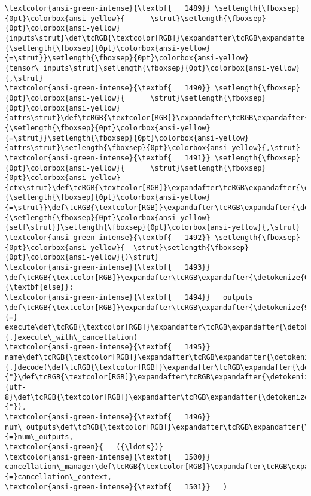 \documentclass[11pt]{article}
\begin{document}
\begin{Verbatim}[commandchars=\\\{\}, frame=single, framerule=2mm, rulecolor=\color{outerrorbackground}]
\textcolor{ansi-green-intense}{\textbf{   1489}} \setlength{\fboxsep}{0pt}\colorbox{ansi-yellow}{      \strut}\setlength{\fboxsep}{0pt}\colorbox{ansi-yellow}{inputs\strut}\def\tcRGB{\textcolor[RGB]}\expandafter\tcRGB\expandafter{\detokenize{98,98,98}}{\setlength{\fboxsep}{0pt}\colorbox{ansi-yellow}{=\strut}}\setlength{\fboxsep}{0pt}\colorbox{ansi-yellow}{tensor\_inputs\strut}\setlength{\fboxsep}{0pt}\colorbox{ansi-yellow}{,\strut}
\textcolor{ansi-green-intense}{\textbf{   1490}} \setlength{\fboxsep}{0pt}\colorbox{ansi-yellow}{      \strut}\setlength{\fboxsep}{0pt}\colorbox{ansi-yellow}{attrs\strut}\def\tcRGB{\textcolor[RGB]}\expandafter\tcRGB\expandafter{\detokenize{98,98,98}}{\setlength{\fboxsep}{0pt}\colorbox{ansi-yellow}{=\strut}}\setlength{\fboxsep}{0pt}\colorbox{ansi-yellow}{attrs\strut}\setlength{\fboxsep}{0pt}\colorbox{ansi-yellow}{,\strut}
\textcolor{ansi-green-intense}{\textbf{   1491}} \setlength{\fboxsep}{0pt}\colorbox{ansi-yellow}{      \strut}\setlength{\fboxsep}{0pt}\colorbox{ansi-yellow}{ctx\strut}\def\tcRGB{\textcolor[RGB]}\expandafter\tcRGB\expandafter{\detokenize{98,98,98}}{\setlength{\fboxsep}{0pt}\colorbox{ansi-yellow}{=\strut}}\def\tcRGB{\textcolor[RGB]}\expandafter\tcRGB\expandafter{\detokenize{0,135,0}}{\setlength{\fboxsep}{0pt}\colorbox{ansi-yellow}{self\strut}}\setlength{\fboxsep}{0pt}\colorbox{ansi-yellow}{,\strut}
\textcolor{ansi-green-intense}{\textbf{   1492}} \setlength{\fboxsep}{0pt}\colorbox{ansi-yellow}{  \strut}\setlength{\fboxsep}{0pt}\colorbox{ansi-yellow}{)\strut}
\textcolor{ansi-green-intense}{\textbf{   1493}} \def\tcRGB{\textcolor[RGB]}\expandafter\tcRGB\expandafter{\detokenize{0,135,0}}{\textbf{else}}:
\textcolor{ansi-green-intense}{\textbf{   1494}}   outputs \def\tcRGB{\textcolor[RGB]}\expandafter\tcRGB\expandafter{\detokenize{98,98,98}}{=} execute\def\tcRGB{\textcolor[RGB]}\expandafter\tcRGB\expandafter{\detokenize{98,98,98}}{.}execute\_with\_cancellation(
\textcolor{ansi-green-intense}{\textbf{   1495}}       name\def\tcRGB{\textcolor[RGB]}\expandafter\tcRGB\expandafter{\detokenize{98,98,98}}{.}decode(\def\tcRGB{\textcolor[RGB]}\expandafter\tcRGB\expandafter{\detokenize{175,0,0}}{"}\def\tcRGB{\textcolor[RGB]}\expandafter\tcRGB\expandafter{\detokenize{175,0,0}}{utf-8}\def\tcRGB{\textcolor[RGB]}\expandafter\tcRGB\expandafter{\detokenize{175,0,0}}{"}),
\textcolor{ansi-green-intense}{\textbf{   1496}}       num\_outputs\def\tcRGB{\textcolor[RGB]}\expandafter\tcRGB\expandafter{\detokenize{98,98,98}}{=}num\_outputs,
\textcolor{ansi-green}{   ({\ldots})}
\textcolor{ansi-green-intense}{\textbf{   1500}}       cancellation\_manager\def\tcRGB{\textcolor[RGB]}\expandafter\tcRGB\expandafter{\detokenize{98,98,98}}{=}cancellation\_context,
\textcolor{ansi-green-intense}{\textbf{   1501}}   )


\end{Verbatim}
\end{document}
